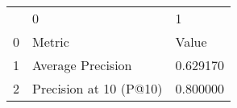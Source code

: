 \begin{tabular}{lll}
 & 0 & 1 \\
0 & Metric & Value \\
1 & Average Precision & 0.629170 \\
2 & Precision at 10 (P@10) & 0.800000 \\
\end{tabular}
